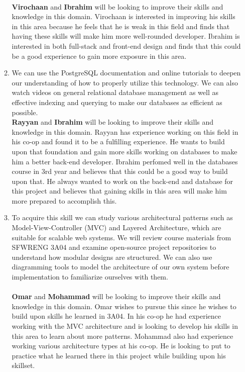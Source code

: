 \begin{enumerate}
\begin{enumerate}
    \\
    \textbf{Virochaan} and \textbf{Ibrahim} will be looking to improve their skills and knowledge in this domain. Virochaan is interested in improving his skills in this area because he feels that he is weak in this field and finds that having these skills will make him more well-rounded developer. Ibrahim is interested in both full-stack and front-end design and finds that this could be a good experience to gain more exposure in this area.  
    \item  We can use the PostgreSQL documentation and online tutorials to deepen our understanding of how to properly utilize this technology. We can also watch videos on general relational database management as well as effective indexing and querying to make our databases as efficient as possible. 
    \\
    \textbf{Rayyan} and \textbf{Ibrahim} will be looking to improve their skills and knowledge in this domain. Rayyan has experience working on this field in his co-op and found it to be a fulfilling experience. He wants to build upon that foundation and gain more skills working on databases to make him a better back-end developer. Ibrahim perfomed well in the databases course in 3rd year and believes that this could be a good way to build upon that. He always wanted to work on the back-end and database for this project and believes that gaining skills in this area will make him more prepared to accomplish this.\\
    \item To acquire this skill we can study various architectural patterns such as Model-View-Controller (MVC) and Layered Architecture, which are suitable for scalable web systems. We will review course materials from SFWRENG 3A04 and examine open-source project repositories to understand how modular designs are structured. We can also use diagramming tools to model the architecture of our own system before implementation to familiarize ourselves with them. \\
    \\
    \textbf{Omar} and \textbf{Mohammad} will be looking to improve their skills and knowledge in this domain. Omar wishes to pursue this since he wishes to build upon skills he learned in 3A04. In his co-op he had experience working with the MVC architecture and is looking to develop his skills in this area to learn about more patterns. Mohammad also had experience working various architecture types at his co-op. He is looking to put to practice what he learned there in this project while building upon his skillset.
  \end{enumerate}
\end{enumerate}

